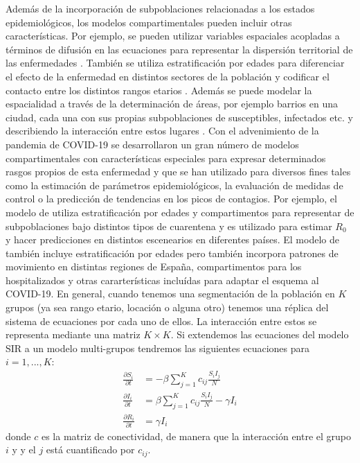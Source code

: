 Además de la incorporación de subpoblaciones relacionadas a los estados epidemiológicos, los modelos compartimentales pueden incluir otras características. Por ejemplo, se pueden utilizar variables espaciales acopladas a términos de difusión en las ecuaciones para representar la dispersión territorial de las enfermedades \citep{Noble1974}. También se utiliza estratificación por edades para diferenciar el efecto de la enfermedad en distintos sectores de la población y codificar el contacto entre los distintos rangos etarios \citep{Hethcote2000}. Además se puede modelar la espacialidad a través de la determinación de áreas, por ejemplo barrios en una ciudad, cada una con sus propias subpoblaciones de susceptibles, infectados etc. y describiendo la interacción entre estos lugares \citep{Klepac2018}. Con el advenimiento de la pandemia de COVID-19 se desarrollaron un gran número de modelos compartimentales con características especiales para expresar determinados rasgos propios de esta enfermedad y que se han utilizado para diversos fines tales como la estimación de parámetros epidemiológicos, la evaluación de medidas de control o la predicción de tendencias en los picos de contagios. Por ejemplo, el modelo de \cite{Evensen2020} utiliza estratificación por edades y compartimentos para representar de subpoblaciones bajo distintos tipos de cuarentena y es utilizado para estimar $R_0$ y hacer predicciones en distintos escenearios en diferentes países. El modelo de \cite{Arenas2020} también incluye estratificación por edades pero también incorpora patrones de movimiento en distintas regiones de España, compartimentos para los hospitalizados y otras cararterísticas incluídas para adaptar el esquema al COVID-19. En general, cuando tenemos una segmentación de la población en $K$ grupos (ya sea rango etario, locación o alguna otro) tenemos una réplica del sistema de ecuaciones por cada uno de ellos. La interacción entre estos se representa mediante una matriz $K \times K$. Si extendemos las ecuaciones del modelo SIR a un modelo multi-grupos tendremos las siguientes ecuaciones para $i=1, ..., K$:
\begin{align}
    \frac{\partial S_i}{\partial t} &= -\beta \sum_{j=1}^{K}c_{ij}\frac{S_i I_j}{N}\\
    \frac{\partial I_i}{\partial t} &= \beta \sum_{j=1}^{K}c_{ij}\frac{S_i I_j}{N} - \gamma I_i \\
    \frac{\partial R_i}{\partial t} &= \gamma I_i
\end{align}
donde $c$ es la matriz de conectividad, de manera que la interacción entre el grupo $i$ y y el $j$ está cuantificado por $c_{ij}$.

